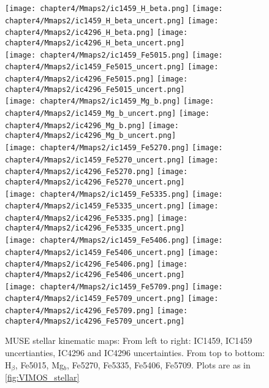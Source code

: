 \begin{figure*}
	\centering
	\texttt{[image: chapter4/Mmaps2/ic1459\_H\_beta.png]}
	\texttt{[image: chapter4/Mmaps2/ic1459\_H\_beta\_uncert.png]}
	\texttt{[image: chapter4/Mmaps2/ic4296\_H\_beta.png]}
	\texttt{[image: chapter4/Mmaps2/ic4296\_H\_beta\_uncert.png]}
	\\
	\texttt{[image: chapter4/Mmaps2/ic1459\_Fe5015.png]}
	\texttt{[image: chapter4/Mmaps2/ic1459\_Fe5015\_uncert.png]}
	\texttt{[image: chapter4/Mmaps2/ic4296\_Fe5015.png]}
	\texttt{[image: chapter4/Mmaps2/ic4296\_Fe5015\_uncert.png]}
	\\
	\texttt{[image: chapter4/Mmaps2/ic1459\_Mg\_b.png]}
	\texttt{[image: chapter4/Mmaps2/ic1459\_Mg\_b\_uncert.png]}
	\texttt{[image: chapter4/Mmaps2/ic4296\_Mg\_b.png]}
	\texttt{[image: chapter4/Mmaps2/ic4296\_Mg\_b\_uncert.png]}
	\\
	\texttt{[image: chapter4/Mmaps2/ic1459\_Fe5270.png]}
	\texttt{[image: chapter4/Mmaps2/ic1459\_Fe5270\_uncert.png]}
	\texttt{[image: chapter4/Mmaps2/ic4296\_Fe5270.png]}
	\texttt{[image: chapter4/Mmaps2/ic4296\_Fe5270\_uncert.png]}
	\\
	\texttt{[image: chapter4/Mmaps2/ic1459\_Fe5335.png]}
	\texttt{[image: chapter4/Mmaps2/ic1459\_Fe5335\_uncert.png]}
	\texttt{[image: chapter4/Mmaps2/ic4296\_Fe5335.png]}
	\texttt{[image: chapter4/Mmaps2/ic4296\_Fe5335\_uncert.png]}
	\\
	\texttt{[image: chapter4/Mmaps2/ic1459\_Fe5406.png]}
	\texttt{[image: chapter4/Mmaps2/ic1459\_Fe5406\_uncert.png]}
	\texttt{[image: chapter4/Mmaps2/ic4296\_Fe5406.png]}
	\texttt{[image: chapter4/Mmaps2/ic4296\_Fe5406\_uncert.png]}
	\\
	\texttt{[image: chapter4/Mmaps2/ic1459\_Fe5709.png]}
	\texttt{[image: chapter4/Mmaps2/ic1459\_Fe5709\_uncert.png]}
	\texttt{[image: chapter4/Mmaps2/ic4296\_Fe5709.png]}
	\texttt{[image: chapter4/Mmaps2/ic4296\_Fe5709\_uncert.png]}
	\\
	\caption[MUSE absorption line strength maps]{MUSE stellar kinematic maps: From left to right: IC1459, IC1459 uncertianties, IC4296 and IC4296 uncertainties. From top to bottom: H$_\beta$, Fe5015, Mg$_b$, Fe5270, Fe5335, Fe5406, Fe5709. Plots are as in \ref{fig:VIMOS_stellar}}
	\label{fig:MUSE_stellar1}
\end{figure*}

